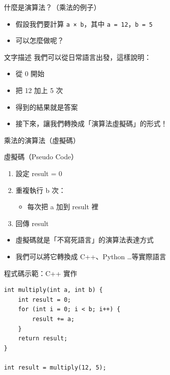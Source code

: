 \documentclass{beamer}
\begin{document}
\begin{frame}{什麼是演算法？（乘法的例子）}
\begin{itemize}
    \item 假設我們要計算 \texttt{a × b}，其中 \texttt{a = 12}，\texttt{b = 5}
    \item 可以怎麼做呢？
\end{itemize}

\vspace{1em}
\begin{block}{文字描述}
我們可以從日常語言出發，這樣說明：
\begin{itemize}
    \item 從 0 開始
    \item 把 12 加上 5 次
    \item 得到的結果就是答案
\end{itemize}
\end{block}

\vspace{0.5em}
\begin{itemize}
    \item 接下來，讓我們轉換成「演算法虛擬碼」的形式！
\end{itemize}
\end{frame}

\begin{frame}{乘法的演算法（虛擬碼）}
\begin{block}{虛擬碼（Pseudo Code）}
\begin{enumerate}
    \item 設定 result = 0
    \item 重複執行 b 次：
    \begin{itemize}
        \item 每次把 a 加到 result 裡
    \end{itemize}
    \item 回傳 result
\end{enumerate}
\end{block}

\vspace{1em}
\begin{itemize}
    \item 虛擬碼就是「不寫死語言」的演算法表達方式
    \item 我們可以將它轉換成 C++、Python …等實際語言
\end{itemize}
\end{frame}

\begin{frame}[fragile]{程式碼示範：C++ 實作}
\vspace{-0.5em}
\begin{lstlisting}[style=cppstyle]
int multiply(int a, int b) {
    int result = 0;
    for (int i = 0; i < b; i++) {
        result += a;
    }
    return result;
}

int result = multiply(12, 5);
\end{lstlisting}
\end{frame}
\end{document}
